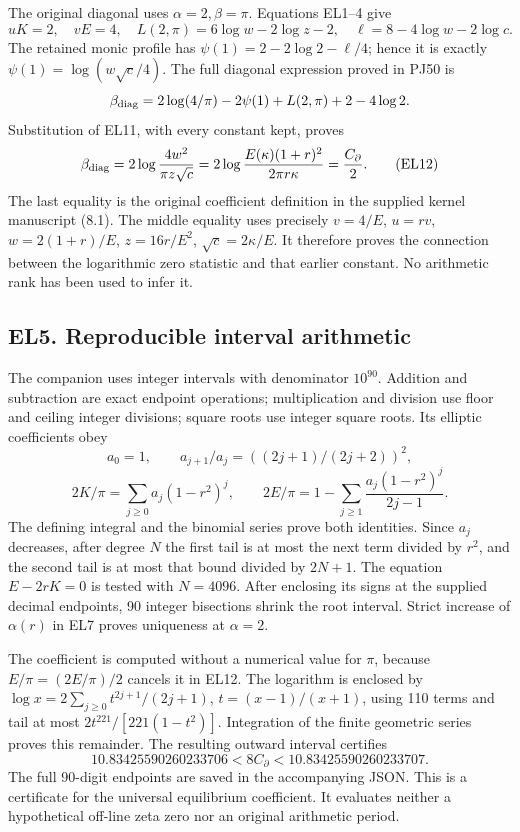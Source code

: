 \documentclass[10pt]{article}
\begin{document}
The original diagonal uses \(\alpha=2,\beta=\pi\). Equations EL1--4 give \[
 uK=2,\quad vE=4,\quad
 L(2,\pi)=6\log w-2\log z-2,
 \quad\ell=8-4\log w-2\log c.
 \tag{EL11}
\] The retained monic profile has \(\psi(1)=2-2\log2-\ell/4\); hence it is exactly \(\psi(1)=\log(w\sqrt c/4)\). The full diagonal expression proved in PJ50 is \[
 \beta_{\rm diag}=2\log(4/\pi)-2\psi(1)+L(2,\pi)+2-4\log2.
\] Substitution of EL11, with every constant kept, proves \[
 \beta_{\rm diag}=2\log\frac{4w^2}{\pi z\sqrt c}
 =2\log\frac{E(\kappa)(1+r)^2}{2\pi r\kappa}
 =\frac{C_\partial}{2}.
 \tag{EL12}
\] The last equality is the original coefficient definition in the supplied kernel manuscript (8.1). The middle equality uses precisely \(v=4/E\), \(u=rv\), \(w=2(1+r)/E\), \(z=16r/E^2\), \(\sqrt c=2\kappa/E\). It therefore proves the connection between the logarithmic zero statistic and that earlier constant. No arithmetic rank has been used to infer it.

\subsection{EL5. Reproducible interval arithmetic}\label{el5.-reproducible-interval-arithmetic}

The companion  uses integer intervals with denominator \(10^{90}\). Addition and subtraction are exact endpoint operations; multiplication and division use floor and ceiling integer divisions; square roots use integer square roots. Its elliptic coefficients obey \[
 a_0=1,\qquad a_{j+1}/a_j=((2j+1)/(2j+2))^2,
\] \[
 2K/\pi=\sum_{j\ge0}a_j(1-r^2)^j,\qquad
 2E/\pi=1-\sum_{j\ge1}\frac{a_j(1-r^2)^j}{2j-1}.
 \tag{EL13}
\] The defining integral and the binomial series prove both identities. Since \(a_j\) decreases, after degree \(N\) the first tail is at most the next term divided by \(r^2\), and the second tail is at most that bound divided by \(2N+1\). The equation \(E-2rK=0\) is tested with \(N=4096\). After enclosing its signs at the supplied decimal endpoints, 90 integer bisections shrink the root interval. Strict increase of \(\alpha(r)\) in EL7 proves uniqueness at \(\alpha=2\).

The coefficient is computed without a numerical value for \(\pi\), because \(E/\pi=(2E/\pi)/2\) cancels it in EL12. The logarithm is enclosed by \(\log x=2\sum_{j\ge0}t^{2j+1}/(2j+1)\), \(t=(x-1)/(x+1)\), using 110 terms and tail at most \(2t^{221}/[221(1-t^2)]\). Integration of the finite geometric series proves this remainder. The resulting outward interval certifies \[
 \boxed{10.83425590260233706<8C_\partial<10.83425590260233707.}
 \tag{EL14}
\] The full 90-digit endpoints are saved in the accompanying JSON. This is a certificate for the universal equilibrium coefficient. It evaluates neither a hypothetical off-line zeta zero nor an original arithmetic period.
\end{document}
